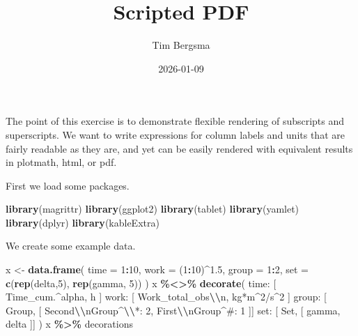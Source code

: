 \documentclass[
]{article}
\title{Scripted PDF}
\author{Tim Bergsma}
\date{2026-01-09}
\newenvironment{Shaded}{\begin{snugshade}}{\end{snugshade}}
\newcommand{\AttributeTok}[1]{\textcolor[rgb]{0.13,0.29,0.53}{#1}}
\newcommand{\DecValTok}[1]{\textcolor[rgb]{0.00,0.00,0.81}{#1}}
\newcommand{\FloatTok}[1]{\textcolor[rgb]{0.00,0.00,0.81}{#1}}
\newcommand{\FunctionTok}[1]{\textcolor[rgb]{0.13,0.29,0.53}{\textbf{#1}}}
\newcommand{\NormalTok}[1]{#1}
\newcommand{\OtherTok}[1]{\textcolor[rgb]{0.56,0.35,0.01}{#1}}
\newcommand{\SpecialCharTok}[1]{\textcolor[rgb]{0.81,0.36,0.00}{\textbf{#1}}}
\newcommand{\StringTok}[1]{\textcolor[rgb]{0.31,0.60,0.02}{#1}}
\begin{document}
\maketitle

The point of this exercise is to demonstrate flexible rendering of
subscripts and superscripts. We want to write expressions for column
labels and units that are fairly readable as they are, and yet can be
easily rendered with equivalent results in plotmath, html, or pdf.

First we load some packages.

\begin{Shaded}
\begin{Highlighting}[]
\FunctionTok{library}\NormalTok{(magrittr)}
\FunctionTok{library}\NormalTok{(ggplot2)}
\FunctionTok{library}\NormalTok{(tablet)}
\FunctionTok{library}\NormalTok{(yamlet)}
\FunctionTok{library}\NormalTok{(dplyr)}
\FunctionTok{library}\NormalTok{(kableExtra)}
\end{Highlighting}
\end{Shaded}

We create some example data.

\begin{Shaded}
\begin{Highlighting}[]
\NormalTok{x }\OtherTok{\textless{}{-}} \FunctionTok{data.frame}\NormalTok{(}
  \AttributeTok{time =} \DecValTok{1}\SpecialCharTok{:}\DecValTok{10}\NormalTok{, }
  \AttributeTok{work =}\NormalTok{ (}\DecValTok{1}\SpecialCharTok{:}\DecValTok{10}\NormalTok{)}\SpecialCharTok{\^{}}\FloatTok{1.5}\NormalTok{, }
  \AttributeTok{group =} \DecValTok{1}\SpecialCharTok{:}\DecValTok{2}\NormalTok{, }
  \AttributeTok{set =} \FunctionTok{c}\NormalTok{(}\FunctionTok{rep}\NormalTok{(}\StringTok{\textquotesingle{}delta\textquotesingle{}}\NormalTok{,}\DecValTok{5}\NormalTok{), }\FunctionTok{rep}\NormalTok{(}\StringTok{\textquotesingle{}gamma\textquotesingle{}}\NormalTok{, }\DecValTok{5}\NormalTok{))}
\NormalTok{)}
\NormalTok{x }\SpecialCharTok{\%\textless{}\textgreater{}\%} \FunctionTok{decorate}\NormalTok{(}\StringTok{\textquotesingle{}}
\StringTok{ time: [ Time\_cum.\^{}alpha, h ]}
\StringTok{ work: [ Work\_total\_obs}\SpecialCharTok{\textbackslash{}\textbackslash{}}\StringTok{n, kg*m\^{}2/s\^{}2 ]}
\StringTok{ group: [ Group, [ Second}\SpecialCharTok{\textbackslash{}\textbackslash{}}\StringTok{nGroup\^{}}\SpecialCharTok{\textbackslash{}\textbackslash{}}\StringTok{*: 2, First}\SpecialCharTok{\textbackslash{}\textbackslash{}}\StringTok{nGroup\^{}\#: 1 ]]}
\StringTok{ set: [ Set, [ gamma, delta ]]}
\StringTok{\textquotesingle{}}\NormalTok{)}
\NormalTok{x }\SpecialCharTok{\%\textgreater{}\%}\NormalTok{ decorations}
\end{Highlighting}
\end{Shaded}
\end{document}

